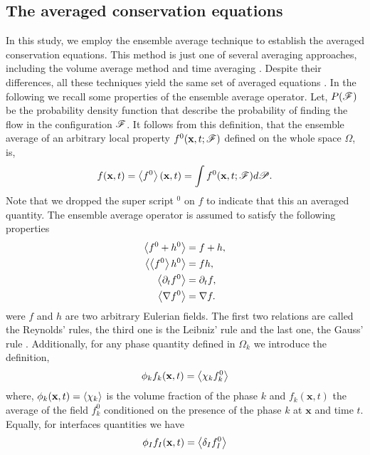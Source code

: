 \subsection{The averaged conservation equations}
In this study, we employ the ensemble average technique to establish the averaged conservation equations. 
This method is just one of several averaging approaches, including the volume average method \citep{jackson1997locally} and time averaging \citep{ishii2010thermo}. 
Despite their differences, all these techniques yield the same set of averaged equations \citep{jackson1997locally,zhang1997momentum}.
In the following we recall some properties of the ensemble average operator. 
Let, $P(\mathscr{F})$ be the probability density function that describe the probability of finding the flow in the configuration $\mathscr{F}$. 
It follows from this definition, that the ensemble average of an arbitrary local property $f^0(\textbf{x},t;\mathscr{F})$ defined on the whole space $\Omega$, is,
\begin{equation}
    f(\textbf{x},t)
    = \left<f^0\right>(\textbf{x},t)
    =\int f^0(\textbf{x},t;\mathscr{F}) d\mathscr{P}. 
    \label{eq:avg}
\end{equation}  
Note that we dropped the super script $^0$ on $f$ to indicate that this an averaged quantity. 
The ensemble average operator is assumed to satisfy the following properties \citep{drew1983mathematical}
\begin{align}
    \left<f^0+h^0\right> &= f+h, \\ 
    \left<\left<f^0\right>h^0\right> &= fh, \\
    \left<\partial_t f^0\right> 
    &= \partial_t f, \\ 
    \left<\mathbf{\nabla} f^0\right>
    &= \mathbf{\nabla} f. 
    \label{eq:avg_properties}
\end{align}
were $f$ and $h$ are two arbitrary Eulerian fields. The first two relations are called the Reynolds' rules, the third one is the Leibniz' rule and the last one, the Gauss' rule \citep{drew1983mathematical}.
Additionally, for any phase quantity defined in $\Omega_k$ we introduce the definition, 
\begin{equation}
    \phi_k f_k (\textbf{x},t) = \left<\chi_k f_k^0\right>
    \label{eq:1_avg}
\end{equation}
where, $\phi_k(\textbf{x},t) = \left<\chi_k\right>$ is the volume fraction of the phase $k$
and $f_k(\textbf{x},t)$ the average of the field $f_k^0$ conditioned on the presence of the phase $k$ at $\textbf{x}$ and time $t$.
Equally, for interfaces quantities we have 
\begin{equation}
    \phi_I f_I (\textbf{x},t) = \left<\delta_I f_I^0\right>
\end{equation}
